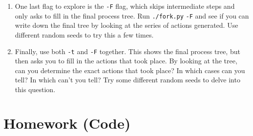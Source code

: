 \documentclass[12pt]{article}
\begin{document}
\begin{enumerate}[1.]
    \item One last flag to explore is the \texttt{-F} flag, which skips intermediate
    steps and only asks to fill in the final process tree. Run \texttt{./fork.py}
    \texttt{-F} and see if you can write down the final tree by looking at the
    series of actions generated. Use different random seeds to try this a
    few times.

    \item Finally, use both \texttt{-t} and \texttt{-F} together. This shows the final process
    tree, but then asks you to fill in the actions that took place. By looking at the tree, can you determine the exact actions that took place?
    In which cases can you tell? In which can’t you tell? Try some different random seeds to delve into this question.
\end{enumerate}

\bigskip

\section{Homework (Code)}
\end{document}
